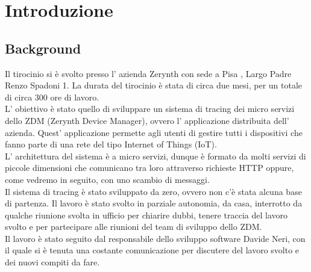 \documentclass[a4paper,12pt,titlepage,italian,openany]{report}
\begin{document}
\begin{frontespizio}
\end{frontespizio}

\tableofcontents

\chapter{Introduzione}
\section{Background}
Il tirocinio si è  svolto presso l' azienda Zerynth con sede a Pisa , Largo Padre Renzo Spadoni 1.
La durata del tirocinio è stata di circa due mesi, per un totale di circa 300 ore di lavoro.
\\[12pt]
L' obiettivo è stato quello di sviluppare un sistema di tracing dei micro servizi dello ZDM\cite{zdm:1} (Zerynth Device Manager), ovvero
l' applicazione distribuita dell' azienda. Quest' applicazione permette agli utenti di gestire tutti i dispositivi che fanno parte di una rete del tipo
Internet of Things (IoT).\\
L' architettura del sistema \`e a micro servizi, dunque è formato da molti servizi di piccole dimensioni che comunicano tra loro attraverso richieste HTTP oppure,
come vedremo in seguito, con uno scambio di messaggi. \\[12pt]


Il sistema di tracing \`e stato sviluppato da zero, ovvero non c'è stata alcuna base di partenza. Il lavoro è stato svolto in parziale autonomia,
da casa, interrotto da qualche riunione svolta in ufficio per chiarire dubbi, tenere traccia del lavoro svolto e per partecipare alle riunioni del team di sviluppo dello ZDM\cite{zdm:1}.\\
Il lavoro è stato seguito dal responsabile dello sviluppo software Davide Neri, con il quale si è tenuta una costante comunicazione per discutere del lavoro svolto e dei nuovi compiti da fare.
\end{document}
